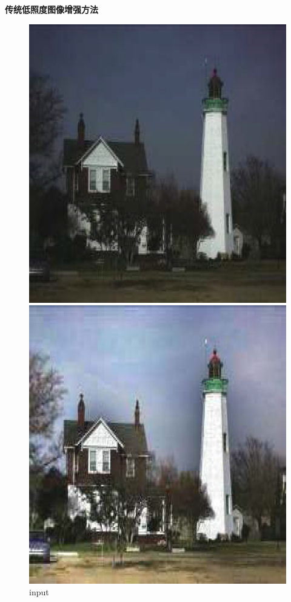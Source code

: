 \documentclass[CJK,aspectratio=169]{beamer}  %
\begin{document}
	\begin{frame}
		{ \yahei \textbf{传统低照度图像增强方法}}
		
		\begin{figure}[htbp] 
			\centering
			\setlength{\abovecaptionskip}{-0.03cm}
			\begin{minipage}{0.18\textwidth}
				\includegraphics[width=\linewidth]{picture/LLIE/Retinex Model/input}
				\captionsetup{font=scriptsize}
				\caption*{\tiny input}
				\label{fig: Retinex Model_input}
			\end{minipage}
			\begin{minipage}{0.18\textwidth}
				\includegraphics[width=\linewidth]{picture/LLIE/Retinex Model/Retinex}

\end{minipage}
\end{figure}
\end{frame}
\end{document}

